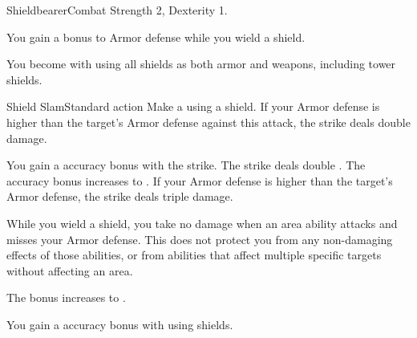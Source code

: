  \begin{feat}{Shieldbearer}{Combat}
    \featpre Strength 2, Dexterity 1.

     You gain a  bonus to Armor defense while you wield a shield.

     You become  with using all shields as both armor and weapons, including tower shields.

    \begin{activeability}{Shield Slam}{Standard action}
        \rankline
        Make a  using a shield.
        If your Armor defense is higher than the target's Armor defense against this attack, the strike deals double damage.

        \rankline
         You gain a  accuracy bonus with the strike.
         The strike deals double .
         The accuracy bonus increases to .
         If your Armor defense is higher than the target's Armor defense, the strike deals triple damage.
    \end{activeability}
    
     While you wield a shield, you take no damage when an area ability attacks and misses your Armor defense.
    This does not protect you from any non-damaging effects of those abilities, or from abilities that affect multiple specific targets without affecting an area.

     The bonus increases to .

     You gain a  accuracy bonus with  using shields.
  \end{feat}

